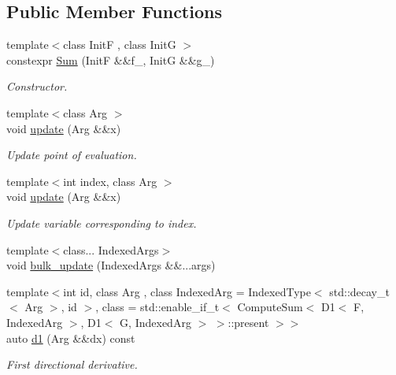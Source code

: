 \subsection*{Public Member Functions}
\begin{DoxyCompactItemize}
\item 
{\footnotesize template$<$class InitF , class InitG $>$ }\\constexpr \hyperlink{structFunG_1_1MathematicalOperations_1_1Sum_a273a3996fc22e4a41d0fba9269a99c96}{Sum} (InitF \&\&f\+\_\+, InitG \&\&g\+\_\+)
\begin{DoxyCompactList}\small\item\em Constructor. \end{DoxyCompactList}\item 
{\footnotesize template$<$class Arg $>$ }\\void \hyperlink{structFunG_1_1MathematicalOperations_1_1Sum_a15985be13a1838d868d2adce8e4f5402}{update} (Arg \&\&x)
\begin{DoxyCompactList}\small\item\em Update point of evaluation. \end{DoxyCompactList}\item 
{\footnotesize template$<$int index, class Arg $>$ }\\void \hyperlink{structFunG_1_1MathematicalOperations_1_1Sum_a4e10622e11a29d739f0d4db364980f9a}{update} (Arg \&\&x)
\begin{DoxyCompactList}\small\item\em Update variable corresponding to index. \end{DoxyCompactList}\item 
{\footnotesize template$<$class... Indexed\+Args$>$ }\\void \hyperlink{structFunG_1_1MathematicalOperations_1_1Sum_a30ca637596f67ab96a3584ff91c0978f}{bulk\+\_\+update} (Indexed\+Args \&\&...args)
\item 
{\footnotesize template$<$int id, class Arg , class Indexed\+Arg  = Indexed\+Type$<$ std\+::decay\+\_\+t$<$ Arg $>$, id $>$, class  = std\+::enable\+\_\+if\+\_\+t$<$                           Compute\+Sum$<$ D1$<$ F, Indexed\+Arg $>$, D1$<$ G, Indexed\+Arg $>$ $>$\+::present $>$$>$ }\\auto \hyperlink{structFunG_1_1MathematicalOperations_1_1Sum_aee8c204769ab30f5ae68f9a8b0fa9bf8}{d1} (Arg \&\&dx) const 
\begin{DoxyCompactList}\small\item\em First directional derivative. \end{DoxyCompactList}\item 

\end{DoxyCompactItemize}
